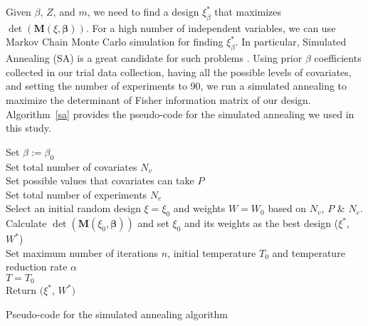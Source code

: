 Given $\beta$, $Z$, and $m$, we need to find a design $\xi_{\beta}^*$ that maximizes $\det (\mathbf{M}(\xi, \mathbf{\beta}))$. For a high number of independent variables, we can use Markov Chain Monte Carlo simulation for finding $\xi_{\beta}^*$. In particular, Simulated Annealing (SA) is a great candidate for such problems \citep{kirkpatrick1983optimization}. Using prior $\beta$ coefficients collected in our trial data collection, having all the possible levels of covariates, and setting the number of experiments to 90, we run a simulated annealing to maximize the determinant of Fisher information matrix of our design. Algorithm~\ref{sa} provides the pseudo-code for the simulated annealing we used in this study.
\begin{algorithm}
Set $\beta := \beta_0$ \\
Set total number of covariates $N_v$\\
Set possible values that covariates can take $P$\\
Set total number of experiments $N_e$ \\
Select an initial random design $\xi = \xi_0$ and  weights $W = W_0$ based on $N_v$, $P$ \& $N_e$. \\
Calculate $\det (\mathbf{M}(\xi_0, \mathbf{\beta}))$ and set $\xi_0$ and its weights as the best design ($\xi^*$,  $W^*$)\\
Set maximum number of iterations $n$, initial temperature $T_0$ and temperature reduction rate $\alpha$\\
$T = T_0$\\
Return $(\xi^{*}$, $W^*)$
\caption{Pseudo-code for the simulated annealing algorithm}\label{sa}
\end{algorithm}\DecMargin{1em}
